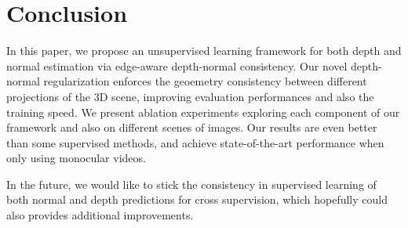 \section{Conclusion} 
In this paper, we propose an unsupervised learning framework for both depth and normal estimation via edge-aware depth-normal consistency. Our novel depth-normal regularization enforces the geoemetry consistency between different projections of the 3D scene, improving evaluation performances and also the training speed.
We present ablation experiments exploring each component of our framework and also on different scenes of images. Our results are even better than some supervised methods, and achieve state-of-the-art performance when only using monocular videos.

In the future, we would like to stick the consistency in supervised learning of both normal and depth predictions for cross supervision, which hopefully could also provides additional improvements.
